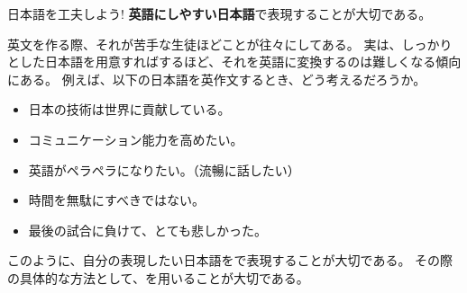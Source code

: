     \begin{techniquebox}{日本語を工夫しよう!}
        \textbf{英語にしやすい日本語}で表現することが大切である。
    \end{techniquebox}
\vspace{1em}
英文を作る際、それが苦手な生徒ほどことが往々にしてある。
実は、しっかりとした日本語を用意すればするほど、それを英語に変換するのは難しくなる傾向にある。
例えば、以下の日本語を英作文するとき、どう考えるだろうか。
\newpage

\begin{itemize}
    \item 日本の技術は世界に貢献している。
    \item コミュニケーション能力を高めたい。
    \item 英語がペラペラになりたい。（流暢に話したい）
    \item 時間を無駄にすべきではない。
    \item 最後の試合に負けて、とても悲しかった。
\end{itemize}
\vspace{1em}

このように、自分の表現したい日本語をで表現することが大切である。
その際の具体的な方法として、を用いることが大切である。
